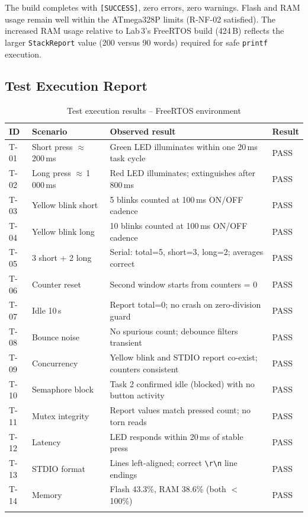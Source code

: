 \documentclass[12pt]{article}
\begin{document}
The build completes with \texttt{[SUCCESS]}, zero errors, zero warnings. Flash and RAM usage remain well within the ATmega328P limits (R-NF-02 satisfied). The increased RAM usage relative to Lab\,3's FreeRTOS build (424\,B) reflects the larger \texttt{StackReport} value (200 versus 90 words) required for safe \texttt{printf} execution.

\subsection{Test Execution Report}

\begin{longtable}{p{0.8cm} p{3.5cm} p{6.5cm} p{1.5cm}}
\toprule
\textbf{ID} & \textbf{Scenario} & \textbf{Observed result} & \textbf{Result} \\
\midrule
\endhead
T-01 & Short press $\approx$\,200\,ms & Green LED illuminates within one 20\,ms task cycle & PASS \\
T-02 & Long press $\approx$\,1\,000\,ms & Red LED illuminates; extinguishes after 800\,ms & PASS \\
T-03 & Yellow blink short & 5 blinks counted at 100\,ms ON/OFF cadence & PASS \\
T-04 & Yellow blink long & 10 blinks counted at 100\,ms ON/OFF cadence & PASS \\
T-05 & 3 short + 2 long & Serial: total=5, short=3, long=2; averages correct & PASS \\
T-06 & Counter reset & Second window starts from counters = 0 & PASS \\
T-07 & Idle 10\,s & Report total=0; no crash on zero-division guard & PASS \\
T-08 & Bounce noise & No spurious count; debounce filters transient & PASS \\
T-09 & Concurrency & Yellow blink and STDIO report co-exist; counters consistent & PASS \\
T-10 & Semaphore block & Task 2 confirmed idle (blocked) with no button activity & PASS \\
T-11 & Mutex integrity & Report values match pressed count; no torn reads & PASS \\
T-12 & Latency & LED responds within 20\,ms of stable press & PASS \\
T-13 & STDIO format & Lines left-aligned; correct \texttt{\textbackslash{}r\textbackslash{}n} line endings & PASS \\
T-14 & Memory & Flash 43.3\%, RAM 38.6\% (both $<$ 100\%) & PASS \\
\bottomrule
\caption{Test execution results -- FreeRTOS environment}
\label{tab:testresults}
\end{longtable}
\end{document}
